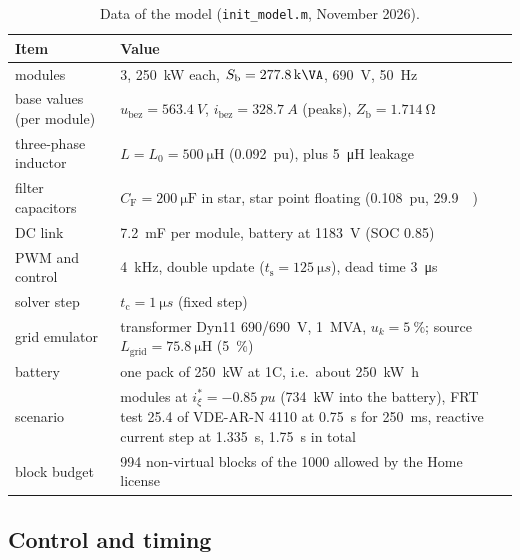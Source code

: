 \documentclass[11pt,a4paper]{scrartcl}
\newcommand{\ped}[1]{_{\mathrm{#1}}}
\newcommand{\code}[1]{\texttt{#1}}
\begin{document}
\begin{onehalfspace}
\begin{table}[H]
	\centering
	\captionsetup{width=0.9\textwidth, font=small}
	\caption{Data of the model (\code{init\_model.m}, November 2026).}
	\label{tab:system}
	\small
	\begin{tabularx}{0.95\textwidth}{@{} >{\raggedright\arraybackslash}p{} X @{}}
		\toprule
		\textbf{Item} & \textbf{Value} \\
		\midrule
		modules & 3, \SI{250}{\kilo\watt} each, $S\ped{b} = \SI{277.8}{\kilo\VA}$, \SI{690}{V}, \SI{50}{Hz} \\
		base values (per module) & $u\ped{bez} = \SI{563.4}{V}$, $i\ped{bez} = \SI{328.7}{A}$ (peaks), $Z\ped{b} = \SI{1.714}{\ohm}$ \\
		three-phase inductor & $L = L_0 = \SI{500}{\micro\henry}$ (0.092~pu), plus \SI{5}{\micro\henry} leakage \\
		filter capacitors & $C\ped{F} = \SI{200}{\micro\farad}$ in star, star point floating (0.108~pu, \SI{29.9}{\kilo\var}) \\
		DC link & \SI{7.2}{\milli\farad} per module, battery at \SI{1183}{V} (SOC 0.85) \\
		PWM and control & \SI{4}{kHz}, double update ($t\ped{s} = \SI{125}{\micro s}$), dead time \SI{3}{\micro s} \\
		solver step & $t\ped{c} = \SI{1}{\micro s}$ (fixed step) \\
		grid emulator & transformer Dyn11 690/\SI{690}{V}, \SI{1}{MVA}, $u_k = \SI{5}{\percent}$; source $L\ped{grid} = \SI{75.8}{\micro\henry}$ (\SI{5}{\percent}) \\
		battery & one pack of \SI{250}{\kilo\watt} at 1C, i.e.\ about \SI{250}{\kilo\watt\hour} \\
		scenario & modules at $i_\xi^* = \SI{-0.85}{pu}$ (\SI{734}{\kilo\watt} into the battery), FRT test 25.4 of VDE-AR-N 4110 at \SI{0.75}{s} for \SI{250}{ms}, reactive current step at \SI{1.335}{s}, \SI{1.75}{s} in total \\
		block budget & 994 non-virtual blocks of the 1000 allowed by the Home license \\
		\bottomrule
	\end{tabularx}
\end{table}

\subsection{Control and timing}


\end{onehalfspace}
\end{document}
